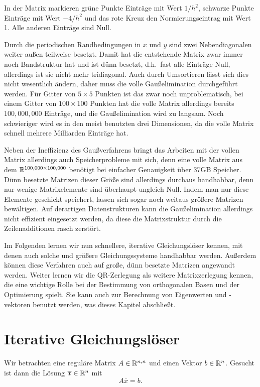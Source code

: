 In der Matrix markieren grüne Punkte Einträge mit Wert $1/h^2$,
schwarze Punkte Einträge mit Wert $-4/h^2$ und das rote Kreuz den
Normierungseintrag mit Wert 1. Alle anderen Einträge sind Null.

Durch die periodischen Randbedingungen in $x$ und $y$ sind zwei
Nebendiagonalen weiter außen teilweise besetzt. Damit hat die
entstehende Matrix zwar immer noch Bandstruktur hat und ist dünn
besetzt, d.h.\ fast alle Einträge Null, allerdings ist sie nicht mehr
tridiagonal. Auch durch Umsortieren lässt sich dies nicht wesentlich
ändern, daher muss die volle Gaußelimination durchgeführt werden. Für
Gitter von $5\times 5$ Punkten ist das zwar noch unproblematisch, bei
einem Gitter von $100\times 100$ Punkten hat die volle Matrix
allerdings bereits $100,000,000$ Einträge, und die Gaußelimination
wird zu langsam. Noch schwieriger wird es in den meist benutzten
drei Dimensionen, da die volle Matrix schnell mehrere Milliarden
Einträge hat.

Neben der Ineffizienz des Gaußverfahrens bringt das Arbeiten mit der
vollen Matrix allerdings auch Speicherprobleme mit sich, denn eine
volle Matrix aus dem $\mathbb{R}^{100,000\times 100,000}$ benötigt bei
einfacher Genauigkeit über 37GB Speicher. Dünn besetzte Matrizen
dieser Größe sind allerdings durchaus handhabbar, denn nur wenige
Matrixelemente sind überhaupt ungleich Null. Indem man nur diese
Elemente geschickt speichert, lassen sich sogar noch weitaus größere
Matrizen bewältigen. Auf derartigen Datenstrukturen kann die
Gaußelimination allerdings nicht effizient eingesetzt werden, da diese
die Matrixstruktur durch die Zeilenadditionen rasch zerstört.

Im Folgenden lernen wir nun schnellere, iterative Gleichungslöser
kennen, mit denen auch solche und größere Gleichungssysteme handhabbar
werden. Außerdem können diese Verfahren auch auf große, dünn besetzte
Matrizen angewandt werden. Weiter lernen wir die QR-Zerlegung als
weitere Matrixzerlegung kennen, die eine wichtige Rolle bei der
Bestimmung von orthogonalen Basen und der 
Optimierung spielt. Sie kann auch zur Berechnung von Eigenwerten und
-vektoren benutzt werden, was dieses Kapitel abschließt.

\section{Iterative Gleichungslöser}

Wir betrachten eine reguläre Matrix $A\in\mathbb{R}^{n,n}$ und einen Vektor
$b\in\mathbb{R}^n$. Gesucht ist dann die Lösung $\overline{x}\in\mathbb{R}^n$ mit
\begin{equation}
  \label{eq:axb}
  A\overline{x} = b.
\end{equation}

